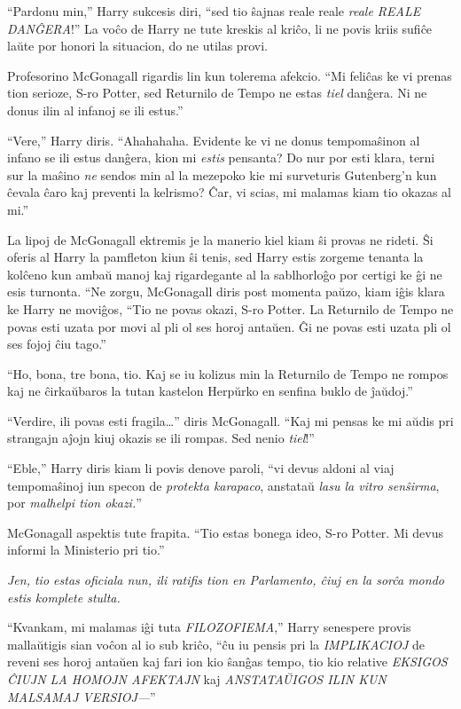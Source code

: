 ``Pardonu min,'' Harry sukcesis diri, ``sed tio ŝajnas reale reale
\emph{reale REALE DANĜERA}!'' La voĉo de Harry ne tute kreskis al
kriĉo, li ne povis kriis sufiĉe laŭte por honori la situacion, do ne
utilas provi.


Profesorino McGonagall rigardis lin kun tolerema afekcio. ``Mi feliĉas
ke vi prenas tion serioze, S-ro Potter, sed Returnilo de Tempo ne
estas \emph{tiel} danĝera. Ni ne donus ilin al infanoj se ili estus.''

``Vere,'' Harry diris. ``Ahahahaha. Evidente ke vi ne donus
tempomaŝinon al infano se ili estus danĝera, kion mi \emph{estis}
pensanta? Do nur por esti klara, terni sur la maŝino \emph{ne} sendos
min al la mezepoko kie mi surveturis Gutenberg'n kun ĉevala ĉaro kaj
preventi la kelrismo? Ĉar, vi scias, mi malamas kiam tio okazas al
mi.''

La lipoj de McGonagall ektremis je la manerio kiel kiam ŝi provas ne
rideti. Ŝi oferis al Harry la pamfleton kiun ŝi tenis, sed Harry estis
zorgeme tenanta la kolĉeno kun ambaŭ manoj kaj rigardegante al la
sablhorloĝo por certigi ke ĝi ne esis turnonta. ``Ne zorgu, McGonagall
diris post momenta paŭzo, kiam iĝis klara ke Harry ne moviĝos, ``Tio
ne povas okazi, S-ro Potter. La Returnilo de Tempo ne povas esti uzata
por movi al pli ol ses horoj antaŭen. Ĝi ne povas esti uzata pli ol
ses fojoj ĉiu tago.''

``Ho, bona, tre bona, tio. Kaj se iu kolizus min la Returnilo de Tempo
ne rompos kaj ne ĉirkaŭbaros la tutan kastelon Herpŭrko en senfina
buklo de ĵaŭdoj.''

``Verdire, ili povas esti fragila\ldots'' diris McGonagall. ``Kaj mi
pensas ke mi aŭdis pri strangajn aĵojn kiuj okazis se ili rompas. Sed
nenio \emph{tiel}!''

``Eble,'' Harry diris kiam li povis denove paroli, ``vi devus aldoni
al viaj tempomaŝinoj iun specon de \emph{protekta karapaco}, anstataŭ
\emph{lasu la vitro senŝirma}, por \emph{malhelpi tion okazi.}''

McGonagall aspektis tute frapita. ``Tio estas bonega ideo, S-ro
Potter. Mi devus informi la Ministerio pri tio.''

\emph{Jen, tio estas oficiala nun, ili ratifis tion en Parlamento,
  ĉiuj en la sorĉa mondo estis komplete stulta.}

``Kvankam, mi malamas iĝi tuta \emph{FILOZOFIEMA},'' Harry senespere
provis mallaŭtigis sian voĉon al io sub kriĉo, ``ĉu iu pensis pri la
\emph{IMPLIKACIOJ} de reveni ses horoj antaŭen kaj fari ion kio ŝanĝas
tempo, tio kio relative \emph{EKSIGOS ĈIUJN LA HOMOJN AFEKTAJN} kaj
\emph{ANSTATAŬIGOS ILIN KUN MALSAMAJ VERSIOJ—}''

